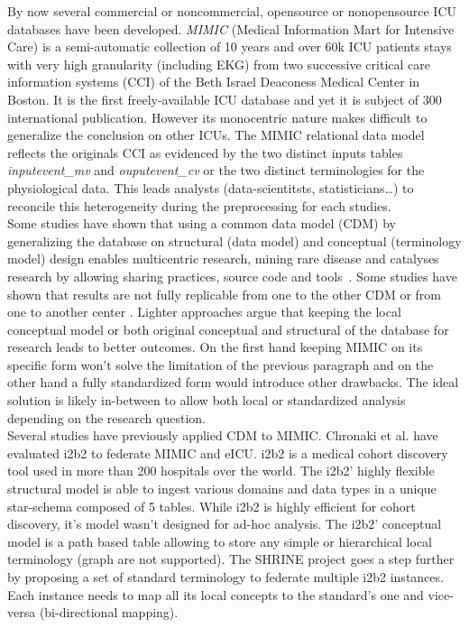 By now several commercial or noncommercial, opensource or nonopensource ICU
databases have been developed.
\emph{MIMIC} (Medical Information Mart for Intensive Care) is a semi-automatic
collection of 10 years and over 60k ICU patients stays with very high
granularity (including EKG) from two successive critical care information
systems (CCI) of the Beth Israel Deaconess Medical Center in Boston. It is the
first freely-available ICU database and yet it is subject of 300 international
publication. However its monocentric nature makes difficult to generalize the
conclusion on other ICUs. The MIMIC relational data model reflects the originals
CCI as evidenced by the two distinct inputs tables \textit{inputevent\_mv} and
\textit{ouputevent\_cv} \cite{mimic-nature} or the two distinct terminologies
for the physiological data. This leads analysts (data-scientitsts,
statisticians\ldots) to reconcile this heterogeneity during the preprocessing
for each studies.
\\

Some studies have shown that using a common data model (CDM) by generalizing
the database on structural (data model) and conceptual (terminology model)
design enables multicentric research, mining rare disease and catalyses
research by allowing sharing practices, source code and
tools \cite{cdm-review}. 
Some studies have shown that results are not fully replicable from one to the
other CDM \cite{cdm-comparison} or from one to another center
\cite{omop-replicability}. Lighter approaches argue that keeping the local
conceptual model \cite{fhir-deep} or both original conceptual and structural
\cite{imi-protect} of the database for research leads to better outcomes. On
the first hand keeping MIMIC on its specific form won't solve the limitation of
the previous paragraph and on the other hand a fully standardized form would
introduce other drawbacks. The ideal solution is likely in-between to allow
both local or standardized analysis depending on the research question.
\\

Several studies have previously applied CDM to MIMIC. Chronaki et al.
\cite{mimic-i2b2} have evaluated i2b2 to federate MIMIC and eICU. i2b2 is a
medical cohort discovery tool used in more than 200 hospitals over the world.
The i2b2' highly flexible structural model is able to ingest various domains
and data types in a unique star-schema composed of 5 tables. While i2b2 is
highly efficient for cohort discovery, it's model wasn't designed for ad-hoc
analysis.
The i2b2' conceptual model is a path based table allowing to store any simple
or hierarchical local terminology (graph are not supported). The SHRINE project
goes a step further by proposing a set of standard terminology to federate
multiple i2b2 instances. Each instance needs to map all its local concepts to
the standard's one and vice-versa \cite{shrine-design} (bi-directional
mapping).

